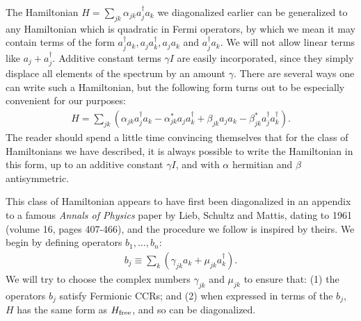 \documentclass[12pt]{article}
\begin{document}
{The Hamiltonian $H = \sum_{jk} \alpha_{jk} a_j^\dagger a_k$ we
diagonalized earlier can be generalized to any Hamiltonian which is
quadratic in Fermi operators, by which we mean it may contain terms of
the form $a^\dagger_j a_k, a_j a_k^\dagger, a_j a_k$ and $a_j^\dagger
a_k$.  We will not allow linear terms like $a_j+a_j^\dagger$.
Additive constant terms $\gamma I$ are easily incorporated, since they
simply displace all elements of the spectrum by an amount $\gamma$.
There are several ways one can write such a Hamiltonian, but the
following form turns out to be especially convenient for our purposes:
\begin{eqnarray}
  H = \sum_{jk} \left( \alpha_{jk} a_j^\dagger a_k -\alpha^*_{jk} a_j a_k^\dagger +
  \beta_{jk} a_j a_k - \beta^*_{jk} a_j^\dagger a_k^\dagger \right).
\end{eqnarray}
The reader should spend a little time convincing themselves that for
the class of Hamiltonians we have described, it is always possible to
write the Hamiltonian in this form, up to an additive constant $\gamma
I$, and with $\alpha$ hermitian and $\beta$ antisymmetric.

This class of Hamiltonian appears to have first been diagonalized in
an appendix to a famous \emph{Annals of Physics} paper by Lieb,
Schultz and Mattis, dating to 1961 (volume 16, pages 407-466), and the
procedure we follow is inspired by theirs.  We begin by defining
operators $b_1,\ldots,b_n$:
\begin{eqnarray}
  b_j \equiv \sum_k \left( \gamma_{jk} a_k + \mu_{jk} a_k^\dagger \right).
\end{eqnarray}
We will try to choose the complex numbers $\gamma_{jk}$ and $\mu_{jk}$
to ensure that: (1) the operators $b_j$ satisfy Fermionic CCRs; and
(2) when expressed in terms of the $b_j$, $H$ has the same form as
$H_{\rm free}$, and so can be diagonalized.

}
\end{document}
